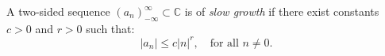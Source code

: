 A two-sided sequence $(a_n)_{-\infty}^{\infty} \subset \mathbb{C}$ is of \textit{slow growth} if there exist constants $c > 0$ and $r > 0$ such that:
\[
|a_n| \leq c |n|^r, \quad \text{for all } n \neq 0.
\]
